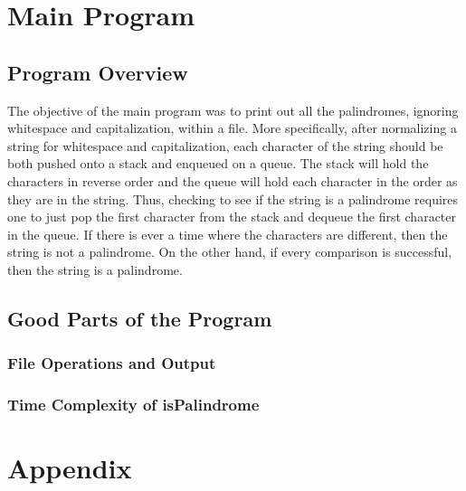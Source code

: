\documentclass[letterpaper, 10pt,DIV=13]{scrartcl}
\numberwithin{equation}{section} %
\numberwithin{figure}{section} %
\numberwithin{table}{section} %
\begin{document}
\section{Main Program}
\subsection{Program Overview}
The objective of the main program was to print out all the palindromes, ignoring whitespace and capitalization, within a file. More specifically, after normalizing
a string for whitespace and capitalization, each character of the string should be both pushed onto a stack and enqueued on a queue. The stack will hold the
characters in reverse order and the queue will hold each character in the order as they are in the string. Thus, checking to see if the string is a palindrome requires
one to just pop the first character from the stack and dequeue the first character in the queue. If there is ever a time where the characters are different, then
the string is not a palindrome. On the other hand, if every comparison is successful, then the string is a palindrome.


\subsection{Good Parts of the Program}
\subsubsection{File Operations and Output}

\subsubsection{Time Complexity of isPalindrome}


\section{Appendix}
\lstset{numbers=left, numberstyle=\tiny, stepnumber=1, numbersep=5pt}

\end{document}
